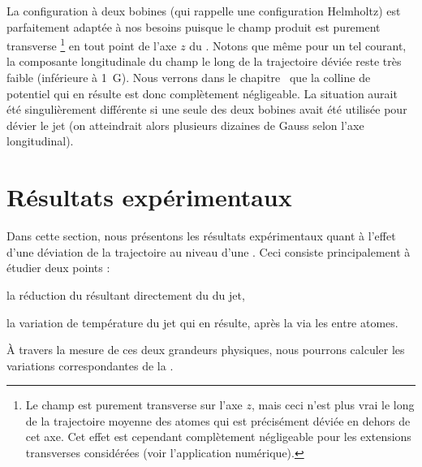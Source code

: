 La configuration à deux bobines (qui rappelle une configuration Helmholtz) est parfaitement adaptée à nos besoins puisque le champ produit est purement transverse%
\footnote{Le champ est purement transverse sur l'axe $z$, mais ceci n'est plus vrai le long de la trajectoire moyenne des atomes qui est précisément déviée en dehors de cet axe. Cet effet est cependant complètement négligeable pour les extensions transverses considérées (voir l'application numérique).}
en tout point de l'axe $z$ du \gm. 
Notons que même pour un tel courant, la composante longitudinale du champ le long de la trajectoire déviée reste très faible (inférieure à \SI{1}{G}). Nous verrons dans le chapitre~ que la colline de potentiel qui en résulte est donc complètement négligeable.
La situation aurait été singulièrement différente si une seule des deux bobines avait été utilisée pour dévier le jet (on atteindrait alors plusieurs dizaines de Gauss selon l'axe longitudinal).

\section{Résultats expérimentaux}
Dans cette section, nous présentons les résultats expérimentaux quant à l'effet d'une déviation de la trajectoire au niveau d'une \pdec. Ceci consiste principalement à étudier deux points :
\begin{itemizel}
	\item la réduction du \fat résultant directement du \fisp du jet,
	\item la variation de température du jet qui en résulte, après la \reth via les \colels entre atomes.
\end{itemizel}
\`A travers la mesure de ces deux grandeurs physiques, nous pourrons calculer les variations correspondantes de la \ddedpup. 


